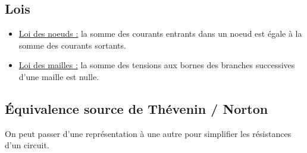 \documentclass[13pt, twoside, a4paper, french]{report}
\begin{document}
            \subsection{Lois}\label{subsec:lois}
                \begin{itemize}
                    \item \underline{Loi des noeuds :} la somme des courants entrants dans un noeud est égale à la somme des courants sortants.
                    \item \underline{Loi des mailles :} la somme des tensions aux bornes des branches successives d'une maille est nulle.
                \end{itemize}
            
            \subsection{Équivalence source de Thévenin / Norton}\label{subsec:equivalence-source-de-thevenin-/-norton}
                
                \begin{figure}[!htb]
                \end{figure}
                
                On peut passer d'une représentation à une autre pour simplifier les résistances d'un circuit.\\
        
\end{document}

